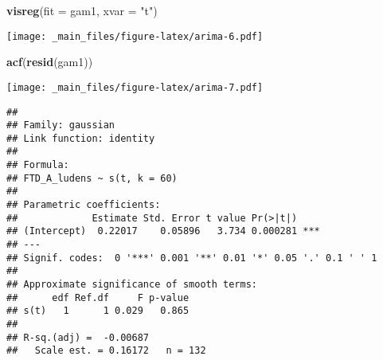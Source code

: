 \documentclass[
]{book}
\newenvironment{Shaded}{\begin{snugshade}}{\end{snugshade}}
\newcommand{\DataTypeTok}[1]{\textcolor[rgb]{0.13,0.29,0.53}{#1}}
\newcommand{\DecValTok}[1]{\textcolor[rgb]{0.00,0.00,0.81}{#1}}
\newcommand{\KeywordTok}[1]{\textcolor[rgb]{0.13,0.29,0.53}{\textbf{#1}}}
\newcommand{\NormalTok}[1]{#1}
\newcommand{\OperatorTok}[1]{\textcolor[rgb]{0.81,0.36,0.00}{\textbf{#1}}}
\newcommand{\StringTok}[1]{\textcolor[rgb]{0.31,0.60,0.02}{#1}}
\begin{document}
\begin{Shaded}
\begin{Highlighting}[]
\KeywordTok{visreg}\NormalTok{(}\DataTypeTok{fit =}\NormalTok{ gam1, }\DataTypeTok{xvar =} \StringTok{"t"}\NormalTok{)}
\end{Highlighting}
\end{Shaded}

\texttt{[image: \_main\_files/figure-latex/arima-6.pdf]}

\begin{Shaded}
\begin{Highlighting}[]
\KeywordTok{acf}\NormalTok{(}\KeywordTok{resid}\NormalTok{(gam1))}
\end{Highlighting}
\end{Shaded}

\texttt{[image: \_main\_files/figure-latex/arima-7.pdf]}

\begin{Shaded}
\end{Shaded}

\begin{verbatim}
## 
## Family: gaussian 
## Link function: identity 
## 
## Formula:
## FTD_A_ludens ~ s(t, k = 60)
## 
## Parametric coefficients:
##             Estimate Std. Error t value Pr(>|t|)    
## (Intercept)  0.22017    0.05896   3.734 0.000281 ***
## ---
## Signif. codes:  0 '***' 0.001 '**' 0.01 '*' 0.05 '.' 0.1 ' ' 1
## 
## Approximate significance of smooth terms:
##      edf Ref.df     F p-value
## s(t)   1      1 0.029   0.865
## 
## R-sq.(adj) =  -0.00687   
##   Scale est. = 0.16172   n = 132
\end{verbatim}

\begin{Shaded}
\end{Shaded}
\end{document}
